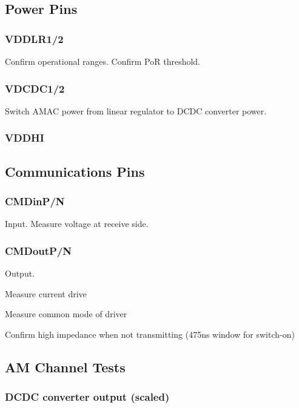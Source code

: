 \documentclass[11pt]{article}   			%
\begin{document}
\subsection{Power Pins}

\subsubsection{VDDLR1/2}
Confirm operational ranges. Confirm PoR threshold.

\subsubsection{VDCDC1/2}
Switch AMAC power from linear regulator to DCDC converter power.

\subsubsection{VDDHI}

\subsection{Communications Pins}

\subsubsection{CMDinP/N}
Input. Measure voltage at receive side.

\subsubsection{CMDoutP/N}
Output.
\begin{compactitem}
    \item{Measure current drive}
    \item{Measure common mode of driver}
    \item{Confirm high impedance when not transmitting (475ns window for switch-on)}
\end{compactitem}

\subsection{AM Channel Tests}

\subsubsection{DCDC converter output (scaled)}
\end{document}
